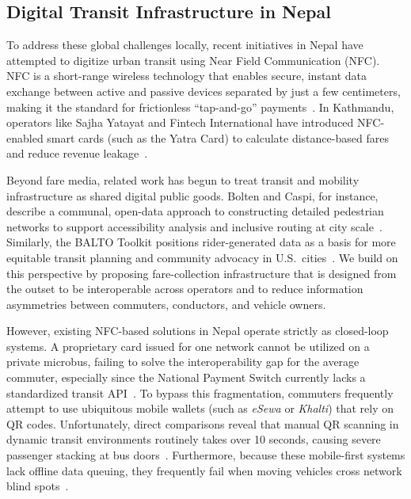 \documentclass[manuscript,review,anonymous]{acmart}
\begin{document}
\subsection{Digital Transit Infrastructure in Nepal}

To address these global challenges locally, recent initiatives in Nepal have attempted to digitize urban transit using Near Field Communication (NFC). NFC is a short-range wireless technology that enables secure, instant data exchange between active and passive devices separated by just a few centimeters, making it the standard for frictionless ``tap-and-go'' payments~\cite{singh2020near}. In Kathmandu, operators like Sajha Yatayat and Fintech International have introduced NFC-enabled smart cards (such as the Yatra Card) to calculate distance-based fares and reduce revenue leakage~\cite{fintech2023yatra, annapurnaexpress2026article}. 

Beyond fare media, related work has begun to treat transit and mobility infrastructure as shared digital public goods. Bolten and Caspi, for instance, describe a communal, open-data approach to constructing detailed pedestrian networks to support accessibility analysis and inclusive routing at city scale~\cite{bolten2022towards}. Similarly, the BALTO Toolkit positions rider-generated data as a basis for more equitable transit planning and community advocacy in U.S.\ cities~\cite{frias2023balto}. We build on this perspective by proposing fare-collection infrastructure that is designed from the outset to be interoperable across operators and to reduce information asymmetries between commuters, conductors, and vehicle owners.

However, existing NFC-based solutions in Nepal operate strictly as closed-loop systems. A proprietary card issued for one network cannot be utilized on a private microbus, failing to solve the interoperability gap for the average commuter, especially since the National Payment Switch currently lacks a standardized transit API~\cite{nrb2025paymentoversight}. To bypass this fragmentation, commuters frequently attempt to use ubiquitous mobile wallets (such as \textit{eSewa} or \textit{Khalti}) that rely on QR codes. Unfortunately, direct comparisons reveal that manual QR scanning in dynamic transit environments routinely takes over 10 seconds, causing severe passenger stacking at bus doors~\cite{chen2020influence}. Furthermore, because these mobile-first systems lack offline data queuing, they frequently fail when moving vehicles cross network blind spots~\cite{kharel2025digital}. 
\end{document}
